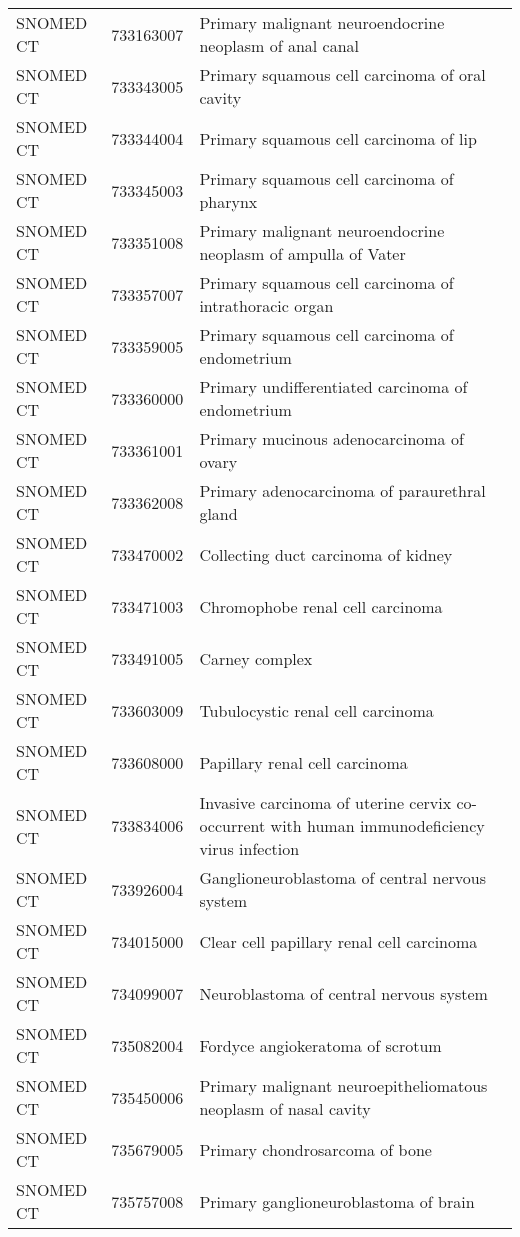 \begin{longtable}{p{}p{}p{}}
  SNOMED CT & 733163007 & Primary malignant neuroendocrine neoplasm of anal canal \\ 
  SNOMED CT & 733343005 & Primary squamous cell carcinoma of oral cavity \\ 
  SNOMED CT & 733344004 & Primary squamous cell carcinoma of lip \\ 
  SNOMED CT & 733345003 & Primary squamous cell carcinoma of pharynx \\ 
  SNOMED CT & 733351008 & Primary malignant neuroendocrine neoplasm of ampulla of Vater \\ 
  SNOMED CT & 733357007 & Primary squamous cell carcinoma of intrathoracic organ \\ 
  SNOMED CT & 733359005 & Primary squamous cell carcinoma of endometrium \\ 
  SNOMED CT & 733360000 & Primary undifferentiated carcinoma of endometrium \\ 
  SNOMED CT & 733361001 & Primary mucinous adenocarcinoma of ovary \\ 
  SNOMED CT & 733362008 & Primary adenocarcinoma of paraurethral gland \\ 
  SNOMED CT & 733470002 & Collecting duct carcinoma of kidney \\ 
  SNOMED CT & 733471003 & Chromophobe renal cell carcinoma \\ 
  SNOMED CT & 733491005 & Carney complex \\ 
  SNOMED CT & 733603009 & Tubulocystic renal cell carcinoma \\ 
  SNOMED CT & 733608000 & Papillary renal cell carcinoma \\ 
  SNOMED CT & 733834006 & Invasive carcinoma of uterine cervix co-occurrent with human immunodeficiency virus infection \\ 
  SNOMED CT & 733926004 & Ganglioneuroblastoma of central nervous system \\ 
  SNOMED CT & 734015000 & Clear cell papillary renal cell carcinoma \\ 
  SNOMED CT & 734099007 & Neuroblastoma of central nervous system \\ 
  SNOMED CT & 735082004 & Fordyce angiokeratoma of scrotum \\ 
  SNOMED CT & 735450006 & Primary malignant neuroepitheliomatous neoplasm of nasal cavity \\ 
  SNOMED CT & 735679005 & Primary chondrosarcoma of bone \\ 
  SNOMED CT & 735757008 & Primary ganglioneuroblastoma of brain \\ 

\end{longtable}
